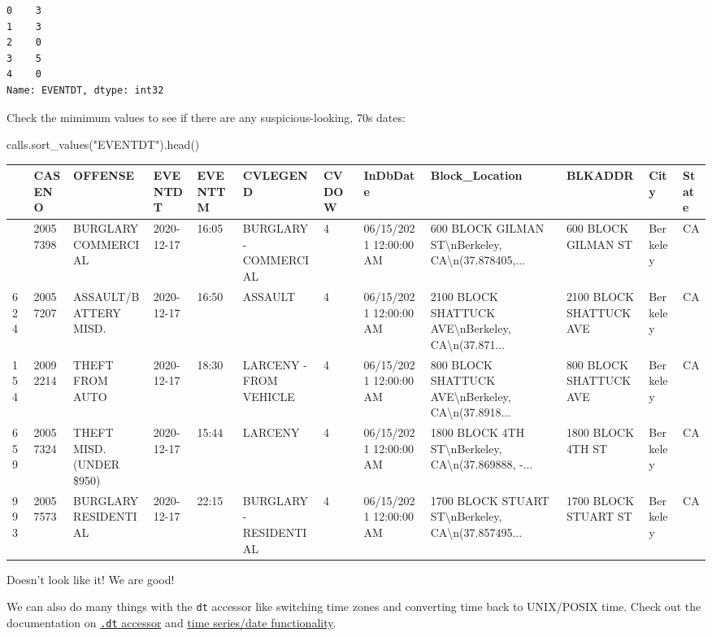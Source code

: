 \documentclass[
  letterpaper,
  DIV=11,
  numbers=noendperiod]{scrreprt}
\newenvironment{Shaded}{\begin{snugshade}}{\end{snugshade}}
\newcommand{\NormalTok}[1]{\textcolor[rgb]{0.00,0.23,0.31}{#1}}
\newcommand{\StringTok}[1]{\textcolor[rgb]{0.13,0.47,0.30}{#1}}
\begin{document}
\begin{verbatim}
0    3
1    3
2    0
3    5
4    0
Name: EVENTDT, dtype: int32
\end{verbatim}

Check the mimimum values to see if there are any suspicious-looking, 70s
dates:

\begin{Shaded}
\begin{Highlighting}[]
\NormalTok{calls.sort\_values(}\StringTok{"EVENTDT"}\NormalTok{).head()}
\end{Highlighting}
\end{Shaded}

\begin{longtable}[]{@{}llllllllllll@{}}
\toprule\noalign{}
& CASENO & OFFENSE & EVENTDT & EVENTTM & CVLEGEND & CVDOW & InDbDate &
Block\_Location & BLKADDR & City & State \\
\midrule\noalign{}
\endhead
\bottomrule\noalign{}
\endlastfoot
2513 & 20057398 & BURGLARY COMMERCIAL & 2020-12-17 & 16:05 & BURGLARY -
COMMERCIAL & 4 & 06/15/2021 12:00:00 AM & 600 BLOCK GILMAN
ST\textbackslash nBerkeley, CA\textbackslash n(37.878405,... & 600 BLOCK
GILMAN ST & Berkeley & CA \\
624 & 20057207 & ASSAULT/BATTERY MISD. & 2020-12-17 & 16:50 & ASSAULT &
4 & 06/15/2021 12:00:00 AM & 2100 BLOCK SHATTUCK
AVE\textbackslash nBerkeley, CA\textbackslash n(37.871... & 2100 BLOCK
SHATTUCK AVE & Berkeley & CA \\
154 & 20092214 & THEFT FROM AUTO & 2020-12-17 & 18:30 & LARCENY - FROM
VEHICLE & 4 & 06/15/2021 12:00:00 AM & 800 BLOCK SHATTUCK
AVE\textbackslash nBerkeley, CA\textbackslash n(37.8918... & 800 BLOCK
SHATTUCK AVE & Berkeley & CA \\
659 & 20057324 & THEFT MISD. (UNDER \$950) & 2020-12-17 & 15:44 &
LARCENY & 4 & 06/15/2021 12:00:00 AM & 1800 BLOCK 4TH
ST\textbackslash nBerkeley, CA\textbackslash n(37.869888, -... & 1800
BLOCK 4TH ST & Berkeley & CA \\
993 & 20057573 & BURGLARY RESIDENTIAL & 2020-12-17 & 22:15 & BURGLARY -
RESIDENTIAL & 4 & 06/15/2021 12:00:00 AM & 1700 BLOCK STUART
ST\textbackslash nBerkeley, CA\textbackslash n(37.857495... & 1700 BLOCK
STUART ST & Berkeley & CA \\
\end{longtable}

Doesn't look like it! We are good!

We can also do many things with the \texttt{dt} accessor like switching
time zones and converting time back to UNIX/POSIX time. Check out the
documentation on
\href{https://pandas.pydata.org/docs/user_guide/basics.html\#basics-dt-accessors}{\texttt{.dt}
accessor} and
\href{https://pandas.pydata.org/docs/user_guide/timeseries.html\#}{time
series/date functionality}.
\end{document}
